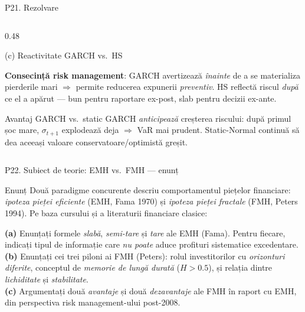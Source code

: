 \documentclass[9pt, aspectratio=169, t]{beamer}
\begin{document}
\begin{frame}[shrink=30]{P21. Rezolvare}
\begin{columns}[T]
\begin{column}{0.48\textwidth}
\begin{block}{(c) Reactivitate GARCH vs.\ HS}
\begin{itemize}
\end{itemize}
\textbf{Consecință risk management}: GARCH avertizează \emph{înainte} de a se materializa pierderile mari $\Rightarrow$ permite reducerea expunerii \emph{preventiv}. HS reflectă riscul \emph{după} ce el a apărut --- bun pentru raportare ex-post, slab pentru decizii ex-ante.
\end{block}
\begin{alertblock}{Avantaj GARCH vs.\ static}
GARCH \emph{anticipează} creșterea riscului: după primul șoc mare, $\sigma_{t+1}$ explodează deja $\Rightarrow$ VaR mai prudent. Static-Normal continuă să dea aceeași valoare conservatoare/optimistă greșit.
\end{alertblock}
\end{column}
\end{columns}
\end{frame}

\begin{frame}{P22. Subiect de teorie: EMH vs.\ FMH --- enunț}
\begin{block}{Enunț}
Două paradigme concurente descriu comportamentul piețelor financiare: \emph{ipoteza pieței eficiente} (EMH, Fama 1970) și \emph{ipoteza pieței fractale} (FMH, Peters 1994). Pe baza cursului și a literaturii financiare clasice:

\textbf{(a)} Enunțați formele \emph{slabă}, \emph{semi-tare} și \emph{tare} ale EMH (Fama). Pentru fiecare, indicați tipul de informație care \emph{nu poate} aduce profituri sistematice excedentare.\\
\textbf{(b)} Enunțați cei trei piloni ai FMH (Peters): rolul investitorilor cu \emph{orizonturi diferite}, conceptul de \emph{memorie de lungă durată} ($H>0.5$), și relația dintre \emph{lichiditate} și \emph{stabilitate}.\\
\textbf{(c)} Argumentați două \emph{avantaje} și două \emph{dezavantaje} ale FMH în raport cu EMH, din perspectiva risk management-ului post-2008.
\end{block}
\end{frame}
\end{document}

